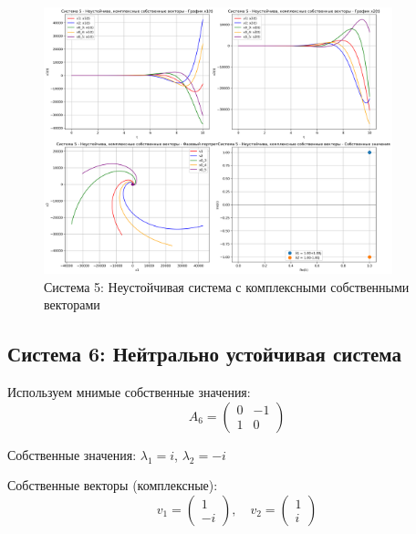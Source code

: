 \begin{figure}[h!]
\centering
\includegraphics[width=0.9\textwidth]{images/task1/система_5_-_неустойчива,_комплексные_собственные_векторы.png}
\caption{Система 5: Неустойчивая система с комплексными собственными векторами}
\label{fig:system5}
\end{figure}

\subsection{Система 6: Нейтрально устойчивая система}

Используем мнимые собственные значения:
\begin{equation}
A_6 = \begin{pmatrix} 0 & -1 \\ 1 & 0 \end{pmatrix}
\end{equation}

Собственные значения: $\lambda_1 = i$, $\lambda_2 = -i$

Собственные векторы (комплексные):
\begin{equation}
v_1 = \begin{pmatrix} 1 \\ -i \end{pmatrix}, \quad v_2 = \begin{pmatrix} 1 \\ i \end{pmatrix}
\end{equation}

